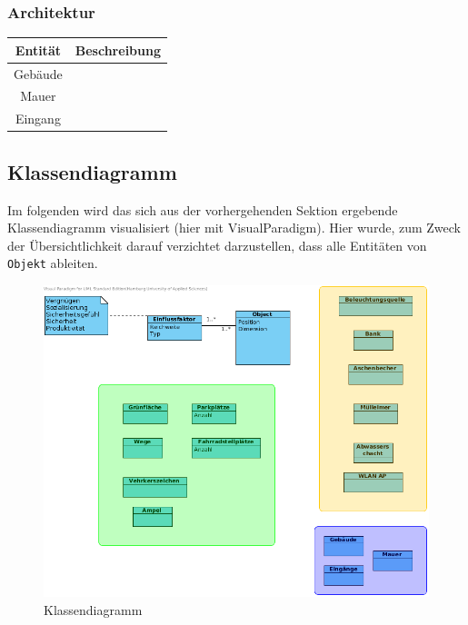 \documentclass[10pt]{scrartcl}
\begin{document}
	\subsubsection{Architektur}
\begin{tabular}{|c|c|}
\hline Entität & Beschreibung \\
\hline	
\hline Gebäude &  \\ 
\hline Mauer &  \\ 
\hline Eingang &  \\ 
\hline 
\end{tabular} 

	\subsection{Klassendiagramm}
	Im folgenden wird das sich aus der vorhergehenden Sektion ergebende Klassendiagramm visualisiert (hier mit VisualParadigm).
	Hier wurde, zum Zweck der Übersichtlichkeit darauf verzichtet darzustellen, dass alle Entitäten von \verb!Objekt! ableiten.
      \begin{figure}[Htp]
        \centering
                \includegraphics[scale=0.6]{img/ClassDiagram.png}
        \caption{Klassendiagramm}
        \label{img:classDiagram}
        \end{figure}  	
	 
	 
\end{document}
